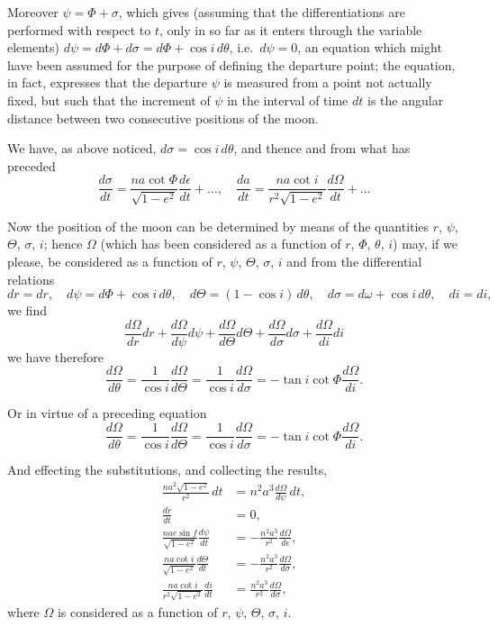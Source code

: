 \documentclass[12pt,a4paper]{article}
\theoremstyle{plain}
\begin{document}
Moreover $\psi = \Phi + \sigma$, which gives (assuming that the differentiations are performed with respect to $t$, only in so far as it enters through the variable elements) $d\psi = d\Phi + d\sigma = d\Phi + \cos i\, d\theta$, i.e.\ $d\psi = 0$, an equation which might have been assumed for the purpose of defining the departure point; the equation, in fact, expresses that the departure $\psi$ is measured from a point not actually fixed, but such that the increment of $\psi$ in the interval of time $dt$ is the angular distance between two consecutive positions of the moon.

We have, as above noticed, $d\sigma = \cos i\, d\theta$, and thence and from what has preceded
\[
\frac{d\sigma}{dt} = \frac{na\cot\Phi}{\sqrt{1-e^2}}\frac{d\epsilon}{dt} + \ldots, \quad \frac{da}{dt} = \frac{na\cot i}{r^2\sqrt{1-e^2}}\frac{d\Omega}{dt} + \ldots
\]

Now the position of the moon can be determined by means of the quantities $r$, $\psi$, $\Theta$, $\sigma$, $i$; hence $\Omega$ (which has been considered as a function of $r$, $\Phi$, $\theta$, $i$) may, if we please, be considered as a function of $r$, $\psi$, $\Theta$, $\sigma$, $i$ and from the differential relations
\[
dr = dr, \quad d\psi = d\Phi + \cos i\, d\theta, \quad d\Theta = (1-\cos i)\, d\theta, \quad d\sigma = d\omega + \cos i\, d\theta, \quad di = di,
\]
we find
\[
\frac{d\Omega}{dr}dr + \frac{d\Omega}{d\psi}d\psi + \frac{d\Omega}{d\Theta}d\Theta + \frac{d\Omega}{d\sigma}d\sigma + \frac{d\Omega}{di}di
\]
we have therefore
\[
\frac{d\Omega}{d\theta} = \frac{1}{\cos i}\frac{d\Omega}{d\Theta} = \frac{1}{\cos i}\frac{d\Omega}{d\sigma} = -\tan i\cot\Phi\frac{d\Omega}{di}.
\]

Or in virtue of a preceding equation
\[
\frac{d\Omega}{d\theta} = \frac{1}{\cos i}\frac{d\Omega}{d\Theta} = \frac{1}{\cos i}\frac{d\Omega}{d\sigma} = -\tan i\cot\Phi\frac{d\Omega}{di}.
\]

And effecting the substitutions, and collecting the results,
\begin{align*}
\frac{na^2\sqrt{1-e^2}}{r^2}\, dt &= n^2a^3\frac{d\Omega}{d\psi}\, dt, \\
\frac{dr}{dt} &= 0, \\
\frac{nae\sin f}{\sqrt{1-e^2}}\frac{d\psi}{dt} &= -\frac{n^2a^3}{r^2}\frac{d\Omega}{d\epsilon}, \\
\frac{na\cot i}{\sqrt{1-e^2}}\frac{d\Theta}{dt} &= -\frac{n^2a^3}{r^2}\frac{d\Omega}{d\sigma}, \\
\frac{na\cot i}{r^2\sqrt{1-e^2}}\frac{di}{dt} &= \frac{n^2a^3}{r^2}\frac{d\Omega}{d\sigma},
\end{align*}
where $\Omega$ is considered as a function of $r$, $\psi$, $\Theta$, $\sigma$, $i$.
\end{document}
